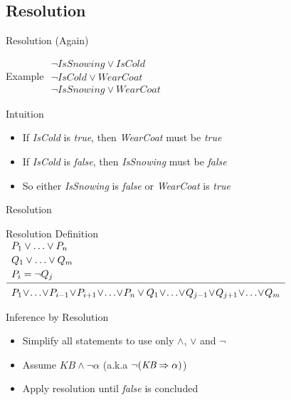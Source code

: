 \documentclass[14pt]{beamer}
\begin{document}
\subsection{Resolution}

\begin{frame}{Resolution (Again)}
	\begin{block}{Example}
		$
		\begin{array}{l}
		\lnot \textit{IsSnowing} \lor \textit{IsCold} \\
		\lnot \textit{IsCold} \lor \textit{WearCoat} \\
		\hline
		\lnot \textit{IsSnowing} \lor \textit{WearCoat}
		\end{array}
		$
	\end{block}
	\begin{block}{Intuition}
		\begin{itemize}
			\item If \textit{IsCold} is \emph{true}, then \textit{WearCoat} must be \emph{true}
			\item If \textit{IsCold} is \emph{false}, then \textit{IsSnowing} must be \emph{false}
			\item So either \textit{IsSnowing} is \emph{false} or \textit{WearCoat} is \emph{true}
		\end{itemize}
	\end{block}
\end{frame}
\begin{frame}{Resolution}
	\begin{block}{Resolution Definition}
	\small
	$
	\begin{array}{l}
		P_1 \lor \ldots \lor P_n \\[.2em]
		Q_1 \lor \ldots \lor Q_m \\[.2em]
		P_i = \lnot Q_j \\[.2em]
		\hline
		\\[-.8em]
		P_1 \!\lor\! \ldots \!\lor\! P_{i-1} \!\lor\! P_{i+1} \!\lor\! \ldots \!\lor\! P_n
		\lor
		Q_1 \!\lor\! \ldots \!\lor\! Q_{j-1} \!\lor\! Q_{j+1} \!\lor\! \ldots \!\lor\! Q_m
	\end{array}
	$
	\end{block}
	\begin{block}{Inference by Resolution}
		\begin{itemize}
			\item Simplify all statements to use only $\land$, $\lor$ and $\lnot$
			\item Assume $\textit{KB} \land \lnot\alpha$ (a.k.a $\lnot (\textit{KB} \Rightarrow \alpha)$)
			\item Apply resolution until \emph{false} is concluded
		\end{itemize}
	\end{block}
\end{frame}
\end{document}
